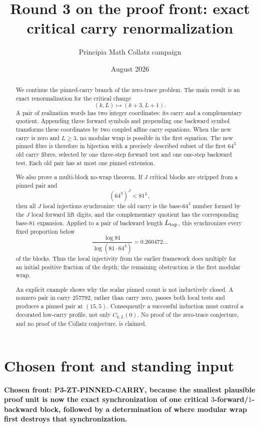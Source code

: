 \documentclass[11pt]{article}
\title{Round 3 on the proof front: exact critical carry renormalization}
\author{Principia Math Collatz campaign}
\date{August 2026}
\theoremstyle{remark}
\begin{document}
\maketitle

\begin{abstract}
We continue the pinned-carry branch of the zero-trace problem.  The main result is an exact renormalization for the critical change
\[
(k,L)\longmapsto(k+3,L+1).
\]
A pair of realization words has two integer coordinates: its carry and a complementary quotient.  Appending three forward symbols and prepending one backward symbol transforms these coordinates by two coupled affine carry equations.  When the new carry is zero and $L\ge3$, no modular wrap is possible in the first equation.  The new pinned fibre is therefore in bijection with a precisely described subset of the first $64^3$ old carry fibres, selected by one three-step forward test and one one-step backward test.  Each old pair has at most one pinned extension.

We also prove a multi-block no-wrap theorem.  If $J$ critical blocks are stripped from a pinned pair and
\[
(64^3)^J<81^L,
\]
then all $J$ local injections synchronize: the old carry is the base-$64^3$ number formed by the $J$ local forward lift digits, and the complementary quotient has the corresponding base-$81$ expansion.  Applied to a pair of backward length $L_{\rm top}$, this synchronizes every fixed proportion below
\[
\frac{\log 81}{\log(81\cdot64^3)}=0.260472\ldots
\]
of the blocks.  Thus the local injectivity from the earlier framework does multiply for an initial positive fraction of the depth; the remaining obstruction is the first modular wrap.

An explicit example shows why the scalar pinned count is not inductively closed.  A nonzero pair in carry $257792$, rather than carry zero, passes both local tests and produces a pinned pair at $(15,5)$.  Consequently a successful induction must control a decorated low-carry profile, not only $C_{k,L}(0)$.  No proof of the zero-trace conjecture, and no proof of the Collatz conjecture, is claimed.
\end{abstract}

\section{Chosen front and standing input}

\textbf{Chosen front: P3-ZT-PINNED-CARRY, because the smallest plausible proof unit is now the exact synchronization of one critical $3$-forward/$1$-backward block, followed by a determination of where modular wrap first destroys that synchronization.}
\end{document}
